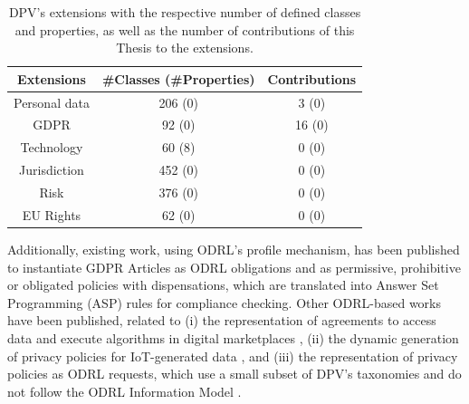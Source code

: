 \begin{table}[htbp]
\centering
\caption[DPV's extensions.]{DPV's extensions with the respective number of defined classes and properties, as well as the number of contributions of this Thesis to the extensions.}
\label{tab:dpv_extensions_contributions} 
\begin{tabular}{ c||c|c}
 Extensions & \#Classes (\#Properties)  & Contributions \\
 \hline\hline
 Personal data & 206 (0) & 3 (0) \\
 \hline
 GDPR & 92 (0) & 16 (0) \\
 \hline
 Technology & 60 (8) & 0 (0) \\
 \hline
 Jurisdiction & 452 (0) & 0 (0) \\
 \hline
 Risk & 376 (0) & 0 (0) \\
 \hline
 EU Rights & 62 (0) & 0 (0) \\
\end{tabular}
\end{table}

Additionally, existing work, using ODRL's profile mechanism, has been published to instantiate GDPR Articles as ODRL obligations \citep{agarwal_legislative_2018} and as permissive, prohibitive or obligated policies with dispensations, which are translated into Answer Set Programming (ASP) rules for compliance checking\citep{de_vos_odrl_2019}.
Other ODRL-based works have been published, related to (i) the representation of agreements to access data and execute algorithms in digital marketplaces \citep{shakeri_modeling_2019}, (ii) the dynamic generation of privacy policies for IoT-generated data \citep{canobenito_injecting_2023}, and (iii) the representation of privacy policies as ODRL requests, which use a small subset of DPV's taxonomies and do not follow the ODRL Information Model \citep{krasnashchok_towards_2020}.